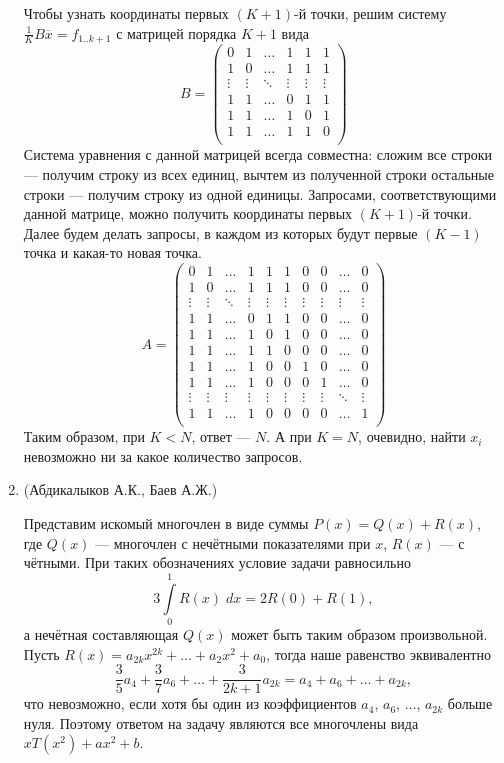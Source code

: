 \documentclass[11pt, a4paper]{article}
\begin{document}
\begin{enumerate}
Чтобы узнать координаты первых $(K + 1)$-й точки, решим систему $\frac{1}{K} B \overline{x} = f_{1 .. k+1}$ с  матрицей порядка $K + 1$ вида
$$
B =
\begin{pmatrix}
0 & 1  &  \hdots & 1 & 1 & 1 \\
1 & 0  &  \hdots & 1 & 1 & 1\\
\vdots  & \vdots & \ddots & \vdots & \vdots & \vdots \\
1 & 1  &  \hdots & 0 & 1 & 1\\
1 & 1  &  \hdots & 1 & 0 & 1\\
1 & 1  &  \hdots & 1 & 1 & 0\\
\end{pmatrix}
$$
Система уравнения с данной матрицей всегда совместна: сложим все строки --- получим строку из всех единиц, вычтем из полученной строки остальные строки --- получим строку из одной единицы. Запросами, соответствующими данной матрице, можно получить координаты первых $(K+1)$-й точки. Далее будем делать запросы, в каждом из которых будут первые $(K-1)$ точка и какая-то новая точка.
$$
A =
\begin{pmatrix}
0 & 1  & \hdots & 1 & 1 & 1 & 0 & 0 & \hdots & 0 \\
1 & 0  &  \hdots & 1 & 1 & 1 & 0 & 0 & \hdots & 0 \\
\vdots  & \vdots & \ddots & \vdots & \vdots & \vdots & \vdots & \vdots & \vdots & \vdots\\
1 & 1  &  \hdots & 0 & 1 & 1 & 0 & 0 & \hdots & 0 \\
1 & 1  &  \hdots & 1 & 0 & 1 & 0 & 0 & \hdots & 0 \\
1 & 1  &  \hdots & 1 & 1 & 0 & 0 & 0 & \hdots & 0 \\
1 & 1 &  \hdots & 1 & 0 & 0 & 1 & 0 & \hdots & 0 \\
1 & 1  &  \hdots & 1 & 0 & 0 & 0 & 1 & \hdots & 0 \\
\vdots & \vdots  &  \vdots & \vdots & \vdots & \vdots & \vdots & \vdots & \ddots & \vdots \\
1 & 1  &  \hdots & 1 & 0 & 0 & 0 & 0 & \hdots & 1 \\
\end{pmatrix}
$$
Таким образом, при $K < N$, ответ --- $N$. А при $K = N$, очевидно, найти $x_i$ невозможно ни за какое количество запросов. 

\newpage

\item (Абдикалыков А.К., Баев А.Ж.) 

Представим искомый многочлен в виде суммы $P(x)=Q(x)+R(x)$, где $Q(x)$ --- многочлен с нечётными показателями при $x$, $R(x)$ --- с чётными. При таких обозначениях условие задачи равносильно
$$
3 \int\limits_{0}^{1} R(x) \; dx = 2 R(0) + R(1),
$$
а нечётная составляющая $Q(x)$ может быть таким образом произвольной. Пусть $R(x)=a_{2k}x^{2k} + \hdots + a_2x^2 + a_0$, тогда наше равенство эквивалентно
$$
\frac{3}{5}a_4+\frac{3}{7}a_6+\hdots+\frac{3}{2k+1}a_{2k}=a_4+a_6+\hdots+a_{2k},
$$
что невозможно, если хотя бы один из коэффициентов $a_4$, $a_6$, $\hdots$, $a_{2k}$ больше нуля. Поэтому ответом на задачу являются все многочлены вида $xT(x^2) + ax^2 + b$.


\end{enumerate}
\end{document}
